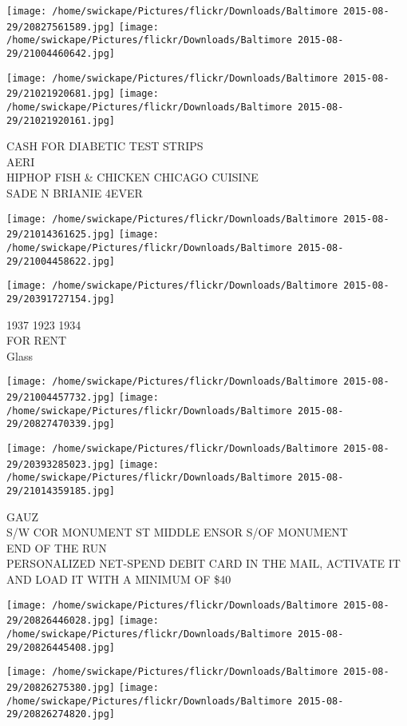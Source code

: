 \documentclass[10pt,letterpaper]{article}
\begin{document}
\texttt{[image: /home/swickape/Pictures/flickr/Downloads/Baltimore 2015-08-29/20827561589.jpg]}
\texttt{[image: /home/swickape/Pictures/flickr/Downloads/Baltimore 2015-08-29/21004460642.jpg]}

\texttt{[image: /home/swickape/Pictures/flickr/Downloads/Baltimore 2015-08-29/21021920681.jpg]}
\texttt{[image: /home/swickape/Pictures/flickr/Downloads/Baltimore 2015-08-29/21021920161.jpg]}

CASH FOR DIABETIC TEST STRIPS\\
AERI\\
HIPHOP FISH \& CHICKEN CHICAGO CUISINE\\
SADE N BRIANIE 4EVER
\pagebreak

\texttt{[image: /home/swickape/Pictures/flickr/Downloads/Baltimore 2015-08-29/21014361625.jpg]}
\texttt{[image: /home/swickape/Pictures/flickr/Downloads/Baltimore 2015-08-29/21004458622.jpg]}

\vspace{0.25in}
\texttt{[image: /home/swickape/Pictures/flickr/Downloads/Baltimore 2015-08-29/20391727154.jpg]}

1937 1923 1934\\
FOR RENT\\
Glass
\pagebreak

\texttt{[image: /home/swickape/Pictures/flickr/Downloads/Baltimore 2015-08-29/21004457732.jpg]}
\texttt{[image: /home/swickape/Pictures/flickr/Downloads/Baltimore 2015-08-29/20827470339.jpg]}

\texttt{[image: /home/swickape/Pictures/flickr/Downloads/Baltimore 2015-08-29/20393285023.jpg]}
\texttt{[image: /home/swickape/Pictures/flickr/Downloads/Baltimore 2015-08-29/21014359185.jpg]}

GAUZ\\
S/W COR MONUMENT ST MIDDLE ENSOR S/OF MONUMENT\\
END OF THE RUN\\
PERSONALIZED NET{-}SPEND DEBIT CARD IN THE MAIL, ACTIVATE IT AND LOAD IT WITH A MINIMUM OF \$40
\pagebreak

\texttt{[image: /home/swickape/Pictures/flickr/Downloads/Baltimore 2015-08-29/20826446028.jpg]}
\texttt{[image: /home/swickape/Pictures/flickr/Downloads/Baltimore 2015-08-29/20826445408.jpg]}

\texttt{[image: /home/swickape/Pictures/flickr/Downloads/Baltimore 2015-08-29/20826275380.jpg]}
\texttt{[image: /home/swickape/Pictures/flickr/Downloads/Baltimore 2015-08-29/20826274820.jpg]}
\end{document}
